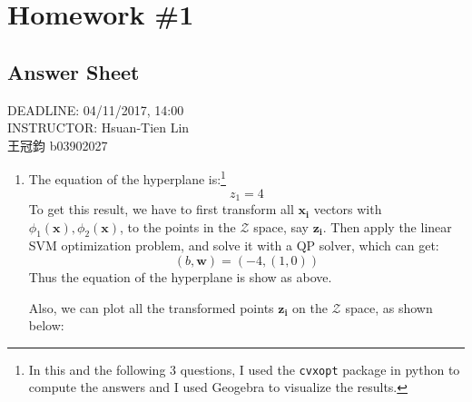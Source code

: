 \documentclass[11pt]{article}
\begin{document}
\section*{Homework \#1}
\subsection*{Answer Sheet}
\begin{center}
DEADLINE: 04/11/2017, 14:00\\
INSTRUCTOR:  Hsuan-Tien Lin\\[0.5cm]
王冠鈞 b03902027
\end{center}


\begin{enumerate}[label=\textbf{\arabic*}.]
	\item The equation of the hyperplane is:\footnote{In this and the following 3 questions, I used the \texttt{cvxopt} package in python to compute the answers and I used Geogebra to visualize the results.}
	\[z_1 = 4\]
	To get this result, we have to first transform all $\mathbf{x_i}$ vectors with $\phi_1(\mathbf{x}), \phi_2(\mathbf{x})$, to the points in the $\mathcal{Z}$ space, say $\mathbf{z_i}$. Then apply the linear SVM optimization problem, and solve it with a QP solver, which can get:
	\[(b, \mathbf{w}) = (-4, (1, 0))\]
	Thus the equation of the hyperplane is show as above.\par 
	Also, we can plot all the transformed points $\mathbf{z_i}$ on the $\mathcal{Z}$ space, as shown below:
	

\end{enumerate}
\end{document}
